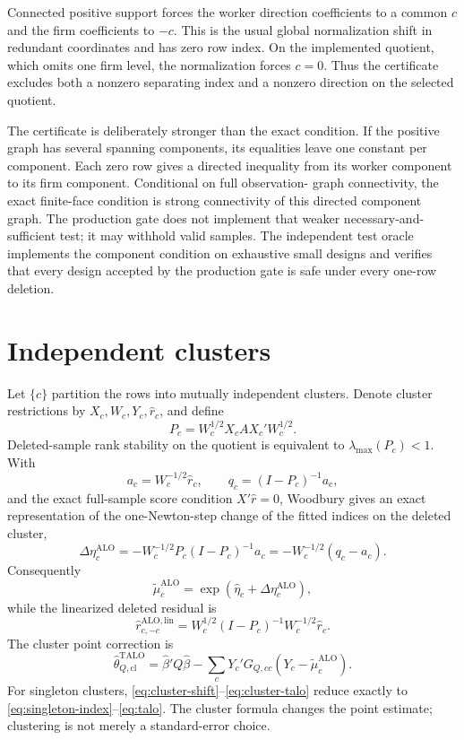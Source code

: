 \documentclass[11pt]{article}
\newcommand{\TALO}{\mathrm{TALO}}
\newcommand{\ALO}{\mathrm{ALO}}
\begin{document}
Connected positive support forces the worker direction coefficients to a
common $c$ and the firm coefficients to $-c$.  This is the usual global
normalization shift in redundant coordinates and has zero row index.  On the
implemented quotient, which omits one firm level, the normalization forces
$c=0$.  Thus the certificate excludes both a nonzero separating index and a
nonzero direction on the selected quotient.

The certificate is deliberately stronger than the exact condition.  If the
positive graph has several spanning components, its equalities leave one
constant per component.  Each zero row gives a directed inequality from its
worker component to its firm component.  Conditional on full observation-
graph connectivity, the exact finite-face condition is strong connectivity
of this directed component graph.  The production gate does not implement
that weaker necessary-and-sufficient test; it may withhold valid samples.
The independent test oracle implements the component condition on exhaustive
small designs and verifies that every design accepted by the production gate
is safe under every one-row deletion.

\section{Independent clusters}

Let $\{c\}$ partition the rows into mutually independent clusters.  Denote
cluster restrictions by $X_c,W_c,Y_c,\widehat r_c$, and define
\begin{equation}
 P_c=W_c^{1/2}X_cAX_c'W_c^{1/2}.                     \label{eq:Pc}
\end{equation}
Deleted-sample rank stability on the quotient is equivalent to
$\lambda_{\max}(P_c)<1$.  With
\[
 a_c=W_c^{-1/2}\widehat r_c,
 \qquad q_c=(I-P_c)^{-1}a_c,
\]
and the exact full-sample score condition $X'\widehat r=0$, Woodbury gives an
exact representation of the one-Newton-step change of the fitted indices on
the deleted cluster,
\begin{equation}
 \Delta\eta_c^{\ALO}
 =-W_c^{-1/2}P_c(I-P_c)^{-1}a_c
 =-W_c^{-1/2}(q_c-a_c).                              \label{eq:cluster-shift}
\end{equation}
Consequently
\[
 \widetilde\mu_c^{\ALO}
 =\exp(\widehat\eta_c+\Delta\eta_c^{\ALO}),
\]
while the linearized deleted residual is
\begin{equation}
 \widehat r_{c,-c}^{\ALO,\mathrm{lin}}
 =W_c^{1/2}(I-P_c)^{-1}W_c^{-1/2}\widehat r_c.        \label{eq:cluster-resid}
\end{equation}
The cluster point correction is
\begin{equation}
 \widehat\theta_{Q,\mathrm{cl}}^{\TALO}
 =\widehat\beta'Q\widehat\beta-
 \sum_cY_c'G_{Q,cc}(Y_c-\widetilde\mu_c^{\ALO}).     \label{eq:cluster-talo}
\end{equation}
For singleton clusters, \eqref{eq:cluster-shift}--\eqref{eq:cluster-talo}
reduce exactly to \eqref{eq:singleton-index}--\eqref{eq:talo}.  The cluster
formula changes the point estimate; clustering is not merely a standard-error
choice.
\end{document}
